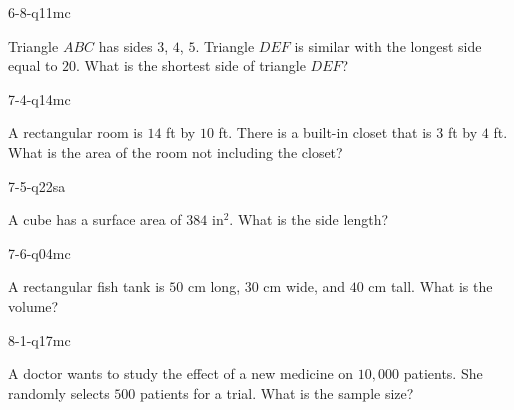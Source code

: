 \begin{practiceQuestion}{6-8-q11}{mc}
\begin{questionText}
Triangle $ABC$ has sides $3$, $4$, $5$. Triangle $DEF$ is similar with the longest side equal to $20$. What is the shortest side of triangle $DEF$?
\end{questionText}
\end{practiceQuestion}

\begin{practiceQuestion}{7-4-q14}{mc}
\begin{questionText}
A rectangular room is $14$ ft by $10$ ft. There is a built-in closet that is $3$ ft by $4$ ft. What is the area of the room not including the closet?
\end{questionText}
\end{practiceQuestion}

\begin{practiceQuestion}{7-5-q22}{sa}
\begin{questionText}
A cube has a surface area of $384$ in$^2$. What is the side length?
\end{questionText}
\end{practiceQuestion}

\begin{practiceQuestion}{7-6-q04}{mc}
\begin{questionText}
A rectangular fish tank is $50$ cm long, $30$ cm wide, and $40$ cm tall. What is the volume?
\end{questionText}
\end{practiceQuestion}

\begin{practiceQuestion}{8-1-q17}{mc}
\begin{questionText}
A doctor wants to study the effect of a new medicine on $10{,}000$ patients. She randomly selects $500$ patients for a trial. What is the sample size?
\end{questionText}
\end{practiceQuestion}

